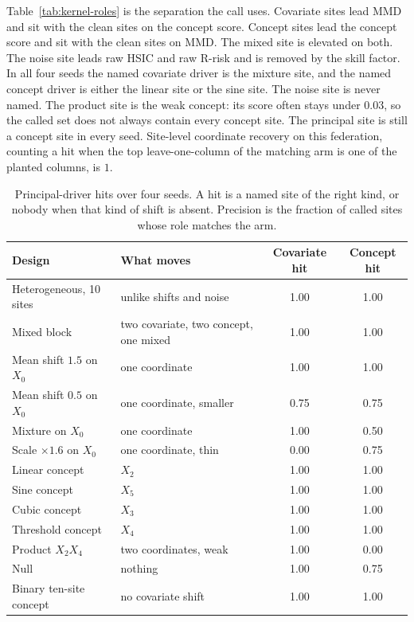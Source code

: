Table~\ref{tab:kernel-roles} is the separation the call uses.
Covariate sites lead MMD and sit with the clean sites on the concept score.
Concept sites lead the concept score and sit with the clean sites on MMD.
The mixed site is elevated on both.
The noise site leads raw HSIC and raw R-risk and is removed by the skill factor.
In all four seeds the named covariate driver is the mixture site, and the named concept driver is either the linear site or the sine site.
The noise site is never named.
The product site is the weak concept: its score often stays under \(0.03\), so the called set does not always contain every concept site.
The principal site is still a concept site in every seed.
Site-level coordinate recovery on this federation, counting a hit when the top leave-one-column of the matching arm is one of the planted columns, is \(1\).

\begin{table}[t]
\centering
\caption{Principal-driver hits over four seeds.
A hit is a named site of the right kind, or nobody when that kind of shift is absent.
Precision is the fraction of called sites whose role matches the arm.}
\label{tab:kernel-hits}
\small
\begin{tabular}{llcc}
\toprule
Design & What moves & Covariate hit & Concept hit \\
\midrule
Heterogeneous, 10 sites & unlike shifts and noise & 1.00 & 1.00 \\
Mixed block & two covariate, two concept, one mixed & 1.00 & 1.00 \\
Mean shift \(1.5\) on \(X_0\) & one coordinate & 1.00 & 1.00 \\
Mean shift \(0.5\) on \(X_0\) & one coordinate, smaller & 0.75 & 0.75 \\
Mixture on \(X_0\) & one coordinate & 1.00 & 0.50 \\
Scale \(\times 1.6\) on \(X_0\) & one coordinate, thin & 0.00 & 0.75 \\
Linear concept & \(X_2\) & 1.00 & 1.00 \\
Sine concept & \(X_5\) & 1.00 & 1.00 \\
Cubic concept & \(X_3\) & 1.00 & 1.00 \\
Threshold concept & \(X_4\) & 1.00 & 1.00 \\
Product \(X_2 X_4\) & two coordinates, weak & 1.00 & 0.00 \\
Null & nothing & 1.00 & 0.75 \\
Binary ten-site concept & no covariate shift & 1.00 & 1.00 \\
\bottomrule
\end{tabular}
\end{table}

